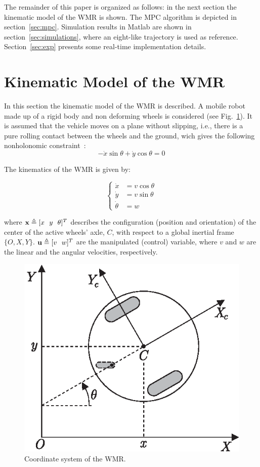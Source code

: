 \documentclass[conference]{IEEEtran} %
\begin{document}
The remainder of this paper is organized as follows: in the next section the kinematic model of the WMR is shown. The MPC algorithm is depicted in section~\ref{sec:mpc}. Simulation results in {\sc Matlab} are shown in section~\ref{sec:simulations}, where an eight-like trajectory is used as reference. Section~\ref{sec:exp} presents some real-time implementation details.


\section{Kinematic Model of the WMR}
\label{sec:model}

In this section the kinematic model of the WMR is described. A mobile robot
made up of a rigid body and non deforming wheels is considered (see Fig.~\ref{fig:robot}). It is assumed that the vehicle moves on a plane without slipping, i.e., there is a pure rolling contact between the wheels and the ground, wich gives the following nonholonomic constraint~\cite{barraquand89}:
\begin{equation}\label{eqn:nc}
	-\dot x\sin\theta + \dot y\cos\theta = 0
\end{equation}

The kinematics of the WMR is given by:

\begin{equation}
\label{eqn:model}
	\left\{
		\begin{aligned}
			\dot x	  &= v\cos\theta \\
			\dot y	  &= v\sin\theta \\
			\dot \theta &= w
		\end{aligned}
	\right.
\end{equation}

\noindent where ${\bf x}\triangleq[x~~y~~\theta]^T$ describes the configuration (position and orientation) of the center of the active wheels' axle, $C$, with respect to a global inertial frame $\{O,X,Y\}$. ${\bf u}\triangleq[v~~w]^T$ are the manipulated (control) variable, where $v$ and $w$ are the linear and the angular velocities, respectively.

\begin{figure}[htbp]
	\centering
	\includegraphics[width=0.67\linewidth]{Figures/robot.eps}
	\caption{Coordinate system of the WMR.}
	\label{fig:robot}
\end{figure}
\end{document}

